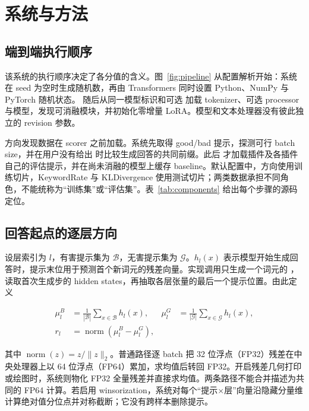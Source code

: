 \section{系统与方法}

\subsection{端到端执行顺序}

该系统的执行顺序决定了各分值的含义。图~\ref{fig:pipeline} 从配置解析开始：系统在 seed 为空时生成随机数，再由 Transformers 同时设置 Python、NumPy 与 PyTorch 随机状态。 随后从同一模型标识和可选  加载 tokenizer、可选 processor 与模型，发现可消融模块，并初始化零增量 LoRA。模型和文本处理器没有彼此独立的 revision 参数。



方向发现数据在 scorer 之前加载。系统先取得 good/bad 提示，探测可行 batch size，并在用户没有给出  时比较生成回答的共同前缀。此后  才加载插件及各插件自己的评估提示，并在尚未消融的模型上缓存 baseline。默认配置中，方向使用训练切片，KeywordRate 与 KLDivergence 使用测试切片；两类数据承担不同角色，不能统称为“训练集”或“评估集”。表~\ref{tab:components} 给出每个步骤的源码定位。



\subsection{回答起点的逐层方向}

设层索引为 $l$，有害提示集为 $\mathcal{B}$，无害提示集为 $\mathcal{G}$。$h_l(x)$ 表示模型开始生成回答时，提示末位用于预测首个新词元的残差向量。实现调用只生成一个词元的 ，读取首次生成步的 hidden states，再抽取各层张量的最后一个提示位置。由此定义

\begin{align}
\mu_l^{B} &= \frac{1}{|\mathcal{B}|}\sum_{x\in\mathcal{B}} h_l(x), &
\mu_l^{G} &= \frac{1}{|\mathcal{G}|}\sum_{x\in\mathcal{G}} h_l(x), \\
r_l &= \operatorname{norm}\!\left(\mu_l^{B}-\mu_l^{G}\right),
\label{eq:direction}
\end{align}

其中 \(\operatorname{norm}(z)=z/\lVert z\rVert_2\)。普通路径逐 batch 把 32 位浮点（FP32）残差在中央处理器上以 64 位浮点（FP64）累加，求均值后转回 FP32。开启残差几何打印或绘图时，系统则物化 FP32 全量残差并直接求均值。两条路径不能合并描述为共同的 FP64 计算。若启用 winsorization，系统对每个“提示$\times$层”向量沿隐藏分量维计算绝对值分位点并对称截断；它没有跨样本删除提示。

